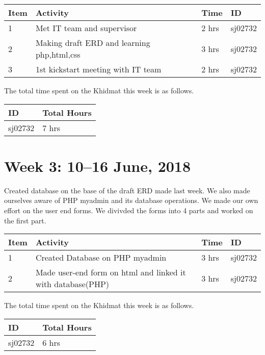 \documentclass{article}
\begin{document}
\begin{tabular}{|l|l|l|l|}
  \hline
  Item 	& Activity & Time & ID \\\hline\hline
  1	& Met IT team and supervisor & 2 hrs & sj02732 \\\hline
  2	& Making draft ERD and learning php,html,css & 3 hrs & sj02732 \\\hline
  3	& 1st kickstart meeting with IT team & 2 hrs & sj02732 \\\hline
\end{tabular}
\newline
The total time spent on the Khidmat this week is as follows.

\begin{tabular}{|l|l|}
  \hline
  ID & Total Hours\\\hline\hline
  sj02732 & 7 hrs\\\hline
\end{tabular}

\newpage %
\section*{Week 3: 10--16 June, 2018}

Created database on the base of the draft ERD made last week. We also made ourselves aware of PHP myadmin and its database operations. We made our own effort on the user end forms. We divivded the forms into 4 parts and worked on the first part. \newline

\begin{tabular}{|l|l|l|l|}
  \hline
  Item 	& Activity & Time & ID \\\hline\hline
  1	& Created Database on PHP myadmin & 3 hrs & sj02732 \\\hline
  2	& Made user-end form on html and linked it with database(PHP) & 3 hrs & sj02732 \\\hline
\end{tabular}
\newline
The total time spent on the Khidmat this week is as follows.

\begin{tabular}{|l|l|}
  \hline
  ID & Total Hours\\\hline\hline
  sj02732 & 6 hrs\\\hline
\end{tabular}
\end{document}
